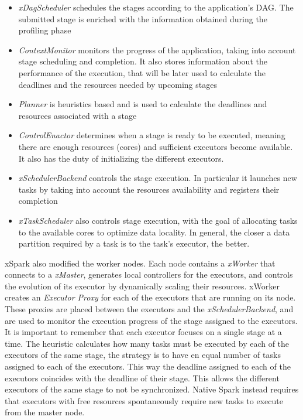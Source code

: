 \begin{itemize}
	\item\textit{xDagScheduler} schedules the stages according to the application’s DAG. The submitted stage is enriched with the information obtained during the profiling phase
	\item\textit{ContextMonitor} monitors the progress of the application, taking into account stage scheduling and completion. It also stores information about the performance of the execution, that will be later used to calculate the deadlines and the resources needed by upcoming stages
	\item\textit{Planner} is heuristics based and is used to calculate the deadlines and resources associated with a stage
	\item\textit{ControlEnactor} determines when a stage is ready to be executed, meaning there are enough resources (cores) and sufficient executors become available. It also has the duty of initializing the different executors.
	\item\textit{xSchedulerBackend} controls the stage execution. In particular it launches new tasks by taking into account the resources availability and registers their completion
	\item\textit{xTaskScheduler} also controls stage execution, with the goal of allocating tasks to the available cores to optimize data locality. 
	In general, the closer a data partition required by a task is to the task’s executor, the better.
\end{itemize}

xSpark also modified the worker nodes. Each node contains a \textit{xWorker}
that connects to a \textit{xMaster}, generates local controllers for the executors,
and controls the evolution of its executor by dynamically scaling
their resources. xWorker creates an \textit{Executor Proxy} for each of the
executors that are running on its node. These proxies are placed between
the executors and the \textit{xSchedulerBackend}, and are used to monitor
the execution progress of the stage assigned to the executors. It is
important to remember that each executor focuses on a single stage
at a time. The heuristic calculates how many tasks must be executed
by each of the executors of the same stage, the strategy is to have en
equal number of tasks assigned to each of the executors. This way the
deadline assigned to each of the executors coincides with the deadline
of their stage. This allows the different executors of the same stage to
not be synchronized. Native Spark instead requires that executors
with free resources spontaneously require new tasks to execute from
the master node. 

